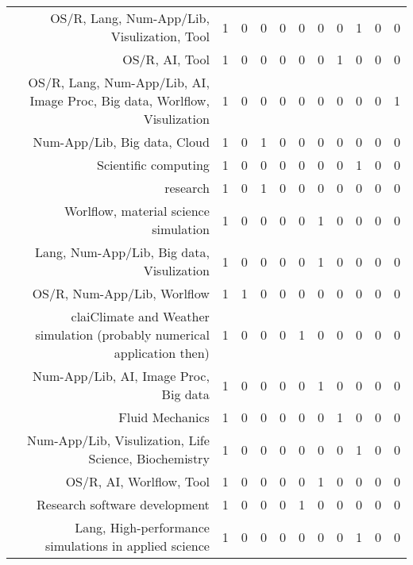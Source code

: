 {\begin{landscape}
\begin{longtable}[htb]{r|c|c|c|c|c|c|c|c|c|c}
{OS/R, Lang, Num-App/Lib, Visulization, Tool} & 1 & 0 & 0 & 0 & 0 & 0 & 0 & 1 & 0 & 0 \\%
{OS/R, AI, Tool} & 1 & 0 & 0 & 0 & 0 & 0 & 1 & 0 & 0 & 0 \\%
{OS/R, Lang, Num-App/Lib, AI, Image Proc, Big data, Worlflow, Visulization} & 1 & 0 & 0 & 0 & 0 & 0 & 0 & 0 & 0 & 1 \\%
{Num-App/Lib, Big data, Cloud} & 1 & 0 & 1 & 0 & 0 & 0 & 0 & 0 & 0 & 0 \\%
{Scientific computing} & 1 & 0 & 0 & 0 & 0 & 0 & 0 & 1 & 0 & 0 \\%
{research} & 1 & 0 & 1 & 0 & 0 & 0 & 0 & 0 & 0 & 0 \\%
{Worlflow, material science simulation} & 1 & 0 & 0 & 0 & 0 & 1 & 0 & 0 & 0 & 0 \\%
{Lang, Num-App/Lib, Big data, Visulization} & 1 & 0 & 0 & 0 & 0 & 1 & 0 & 0 & 0 & 0 \\%
{OS/R, Num-App/Lib, Worlflow} & 1 & 1 & 0 & 0 & 0 & 0 & 0 & 0 & 0 & 0 \\%
{claiClimate and Weather simulation (probably numerical application then)} & 1 & 0 & 0 & 0 & 1 & 0 & 0 & 0 & 0 & 0 \\%
{Num-App/Lib, AI, Image Proc, Big data} & 1 & 0 & 0 & 0 & 0 & 1 & 0 & 0 & 0 & 0 \\%
{Fluid Mechanics} & 1 & 0 & 0 & 0 & 0 & 0 & 1 & 0 & 0 & 0 \\%
{Num-App/Lib, Visulization, Life Science, Biochemistry} & 1 & 0 & 0 & 0 & 0 & 0 & 0 & 1 & 0 & 0 \\%
{OS/R, AI, Worlflow, Tool} & 1 & 0 & 0 & 0 & 0 & 1 & 0 & 0 & 0 & 0 \\%
{Research software development} & 1 & 0 & 0 & 0 & 1 & 0 & 0 & 0 & 0 & 0 \\%
{Lang, High-performance simulations in applied science} & 1 & 0 & 0 & 0 & 0 & 0 & 0 & 1 & 0 & 0 \\%
\hline%
\end{longtable}%
\end{landscape}}%
\clearpage%
